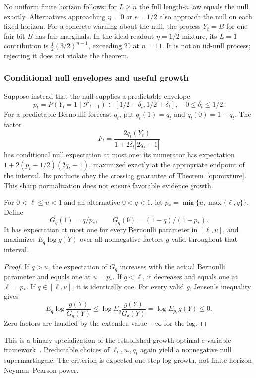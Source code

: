 No uniform finite horizon follows: for \(L\ge n\) the full length-\(n\)
law equals the null exactly.  Alternatives approaching \(\eta=0\) or
\(\epsilon=1/2\) also approach the null on each fixed horizon.
For a concrete warning about the null, the process \(Y_t=B\) for one
fair bit \(B\) has fair marginals.  In the ideal-readout
\(\eta=1/2\) mixture, its \(L=1\) contribution is
\(\frac12(3/2)^{n-1}\), exceeding \(20\) at \(n=11\).
It is not an iid-null process; rejecting it does not violate the theorem.

\subsubsection{Conditional null envelopes and useful growth}

Suppose instead that the null supplies a predictable envelope
\[
 p_t=P(Y_t=1\mid\mathcal F_{t-1})
 \in[1/2-\delta_t,1/2+\delta_t],\quad 0\le\delta_t\le1/2 .
\]
For a predictable Bernoulli forecast \(q_t\), put \(q_t(1)=q_t\) and
\(q_t(0)=1-q_t\).  The factor
\[
 F_t=\frac{2q_t(Y_t)}
           {1+2\delta_t|2q_t-1|}
\]
has conditional null expectation at most one: its numerator has
expectation \(1+2(p_t-1/2)(2q_t-1)\), maximized exactly at the appropriate
endpoint of the interval.  Its products obey the crossing guarantee of
Theorem~\ref{op:mixture}.  This sharp normalization does not ensure
favorable evidence growth.

\begin{theorem}
\label{op:clipped}
For \(0<\ell\le u<1\) and an alternative \(0<q<1\), let
\(p_*=\min\{u,\max\{\ell,q\}\}\).  Define
\[
 G_q(1)=q/p_*,\qquad G_q(0)=(1-q)/(1-p_*).
\]
It has expectation at most one for every Bernoulli parameter in
\([\ell,u]\), and maximizes \(E_q\log g(Y)\) over all nonnegative
factors \(g\) valid throughout that interval.
\end{theorem}
\begin{proof}
If \(q>u\), the expectation of \(G_q\) increases with the actual
Bernoulli parameter and equals one at \(u=p_*\).
If \(q<\ell\), it decreases and equals one at \(\ell=p_*\).
If \(q\in[\ell,u]\), it is identically one.
For every valid \(g\), Jensen's inequality gives
\[
 E_q\log\frac{g(Y)}{G_q(Y)}
 \le\log E_q\frac{g(Y)}{G_q(Y)}
 =\log E_{p_*}g(Y)\le0.
\]
Zero factors are handled by the extended value \(-\infty\) for the log.
\end{proof}

This is a binary specialization of the established growth-optimal
e-variable framework~\cite{op:larsson}.  Predictable choices of
\(\ell_t,u_t,q_t\) again yield a nonnegative null supermartingale.
The criterion is expected one-step log growth, not finite-horizon
Neyman--Pearson power.

